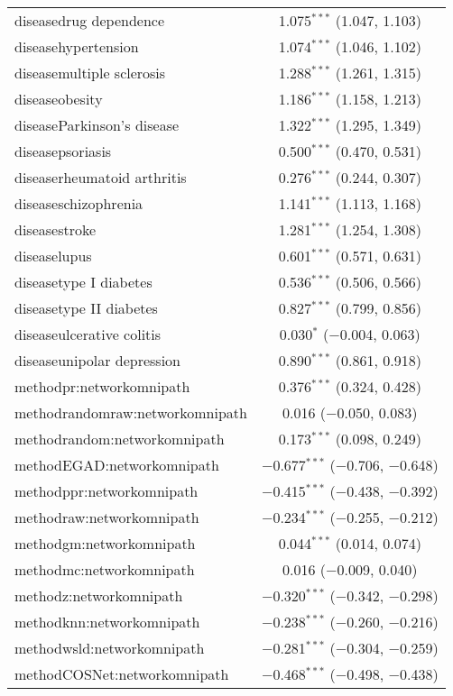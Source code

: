 \begin{table}[!htbp]
\begin{tabular}{@{\extracolsep{5pt}}lc}
  diseasedrug dependence & 1.075$^{***}$ (1.047, 1.103) \\ 
  diseasehypertension & 1.074$^{***}$ (1.046, 1.102) \\ 
  diseasemultiple sclerosis & 1.288$^{***}$ (1.261, 1.315) \\ 
  diseaseobesity & 1.186$^{***}$ (1.158, 1.213) \\ 
  diseaseParkinson's disease & 1.322$^{***}$ (1.295, 1.349) \\ 
  diseasepsoriasis & 0.500$^{***}$ (0.470, 0.531) \\ 
  diseaserheumatoid arthritis & 0.276$^{***}$ (0.244, 0.307) \\ 
  diseaseschizophrenia & 1.141$^{***}$ (1.113, 1.168) \\ 
  diseasestroke & 1.281$^{***}$ (1.254, 1.308) \\ 
  diseaselupus & 0.601$^{***}$ (0.571, 0.631) \\ 
  diseasetype I diabetes & 0.536$^{***}$ (0.506, 0.566) \\ 
  diseasetype II diabetes & 0.827$^{***}$ (0.799, 0.856) \\ 
  diseaseulcerative colitis & 0.030$^{*}$ ($-$0.004, 0.063) \\ 
  diseaseunipolar depression & 0.890$^{***}$ (0.861, 0.918) \\ 
  methodpr:networkomnipath & 0.376$^{***}$ (0.324, 0.428) \\ 
  methodrandomraw:networkomnipath & 0.016 ($-$0.050, 0.083) \\ 
  methodrandom:networkomnipath & 0.173$^{***}$ (0.098, 0.249) \\ 
  methodEGAD:networkomnipath & $-$0.677$^{***}$ ($-$0.706, $-$0.648) \\ 
  methodppr:networkomnipath & $-$0.415$^{***}$ ($-$0.438, $-$0.392) \\ 
  methodraw:networkomnipath & $-$0.234$^{***}$ ($-$0.255, $-$0.212) \\ 
  methodgm:networkomnipath & 0.044$^{***}$ (0.014, 0.074) \\ 
  methodmc:networkomnipath & 0.016 ($-$0.009, 0.040) \\ 
  methodz:networkomnipath & $-$0.320$^{***}$ ($-$0.342, $-$0.298) \\ 
  methodknn:networkomnipath & $-$0.238$^{***}$ ($-$0.260, $-$0.216) \\ 
  methodwsld:networkomnipath & $-$0.281$^{***}$ ($-$0.304, $-$0.259) \\ 
  methodCOSNet:networkomnipath & $-$0.468$^{***}$ ($-$0.498, $-$0.438) \\ 

\end{tabular}
\end{table}
